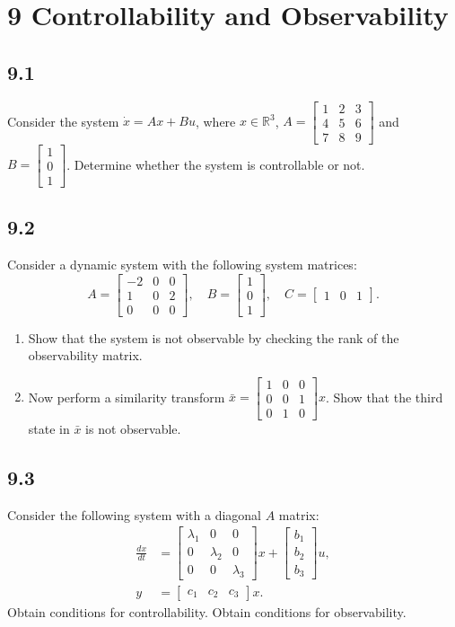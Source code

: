 \documentclass{article}
\newcommand{\problem}[2]{\subsection*{#1}}
\begin{document}
\section*{9 Controllability and Observability}

\problem{9.1}{}
Consider the system $\dot{x} = Ax + Bu$, where $x \in \mathbb{R}^3$, $A = \begin{bmatrix} 1 & 2 & 3 \\ 4 & 5 & 6 \\ 7 & 8 & 9 \end{bmatrix}$ and $B = \begin{bmatrix} 1 \\ 0 \\ 1 \end{bmatrix}$. Determine whether the system is controllable or not.

\problem{9.2}{third-order-checks}
Consider a dynamic system with the following system matrices:
\[
A = \begin{bmatrix} -2 & 0 & 0 \\ 1 & 0 & 2 \\ 0 & 0 & 0 \end{bmatrix}, \quad
B = \begin{bmatrix} 1 \\ 0 \\ 1 \end{bmatrix}, \quad
C = \begin{bmatrix} 1 & 0 & 1 \end{bmatrix}.
\]
\begin{enumerate}
\item Show that the system is not observable by checking the rank of the observability matrix.
\item Now perform a similarity transform $\bar{x} = \begin{bmatrix} 1 & 0 & 0 \\ 0 & 0 & 1 \\ 0 & 1 & 0 \end{bmatrix} x$. Show that the third state in $\bar{x}$ is not observable.
\end{enumerate}

\problem{9.3}{}
Consider the following system with a diagonal $A$ matrix:
\[
\begin{aligned}
\frac{dx}{dt} &= \begin{bmatrix} \lambda_1 & 0 & 0 \\ 0 & \lambda_2 & 0 \\ 0 & 0 & \lambda_3 \end{bmatrix} x + \begin{bmatrix} b_1 \\ b_2 \\ b_3 \end{bmatrix} u, \\
y &= \begin{bmatrix} c_1 & c_2 & c_3 \end{bmatrix} x.
\end{aligned}
\]
Obtain conditions for controllability. Obtain conditions for observability.
\end{document}
